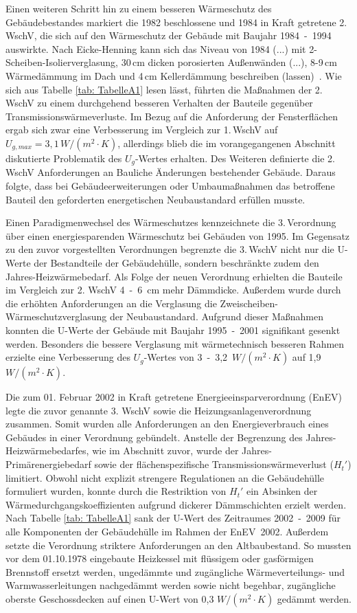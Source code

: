 Einen weiteren Schritt hin zu einem besseren Wärmeschutz des Gebäudebestandes markiert die 1982 beschlossene und 1984 in Kraft getretene 2. WschV, die sich auf den Wärmeschutz der Gebäude mit Baujahr \mbox{1984 - 1994} auswirkte.
Nach Eicke-Henning kann sich \glqq das Niveau von 1984 (...) mit 2-Scheiben-Isolierverglasung, 30\,cm dicken porosierten Außenwänden (...), 8-9\,cm Wärmedämmung im Dach und 4\,cm Kellerdämmung beschreiben (lassen) \grqq\,\cite{EickeHenning.2011}.
Wie sich aus Tabelle \ref{tab: TabelleA1} lesen lässt, führten die Maßnahmen der 2.\,WschV zu einem durchgehend besseren Verhalten der Bauteile gegenüber Transmissionswärmeverluste. 
Im Bezug auf die Anforderung der Fensterflächen ergab sich zwar eine Verbesserung im Vergleich zur 1.\,WschV auf \(U_{g, max} = 3,1\,W/(m^2 \cdot K) \), allerdings blieb die im vorangegangenen Abschnitt diskutierte Problematik des \(U_g\)-Wertes erhalten.
Des Weiteren definierte die 2. WschV Anforderungen an \glqq Bauliche Änderungen bestehender Gebäude\grqq.
Daraus folgte, dass bei Gebäudeerweiterungen oder Umbaumaßnahmen das betroffene Bauteil den geforderten energetischen Neubaustandard erfüllen musste.

Einen Paradigmenwechsel des Wärmeschutzes kennzeichnete die 3.\,Verordnung über einen energiesparenden Wärmeschutz bei Gebäuden von 1995.
Im Gegensatz zu den zuvor vorgestellten Verordnungen begrenzte die 3.\,WschV nicht nur die U-Werte der Bestandteile der Gebäudehülle, sondern beschränkte zudem den Jahres-Heizwärmebedarf.
Als Folge der neuen Verordnung erhielten die Bauteile im Vergleich zur 2. WschV \mbox{4 - 6 cm} mehr Dämmdicke. 
Außerdem wurde durch die erhöhten Anforderungen an die Verglasung die Zweischeiben-Wärmeschutzverglasung der Neubaustandard.
Aufgrund dieser Maßnahmen konnten die U-Werte der Gebäude mit Baujahr \mbox{1995 - 2001} signifikant gesenkt werden.
Besonders die bessere Verglasung mit wärmetechnisch besseren Rahmen erzielte eine Verbesserung des \(U_g\)-Wertes von \mbox{3 - 3,2 \(W/(m^2 \cdot K) \)} auf 1,9\,\(W/(m^2 \cdot K) \).

Die zum 01. Februar 2002 in Kraft getretene Energieeinsparverordnung (EnEV) legte die zuvor genannte 3. WschV sowie die Heizungsanlagenverordnung zusammen. 
Somit wurden alle Anforderungen an den Energieverbrauch eines Gebäudes in einer Verordnung gebündelt.
Anstelle der Begrenzung des Jahres-Heizwärmebedarfes, wie im Abschnitt zuvor, wurde der Jahres-Primärenergiebedarf sowie der flächenspezifische Transmissionswärmeverlust (\(H_t'\)) limitiert.
Obwohl nicht explizit strengere Regulationen an die Gebäudehülle formuliert wurden, konnte durch die Restriktion von \(H_t'\) ein Absinken der Wärmedurchgangskoeffizienten aufgrund dickerer Dämmschichten erzielt werden.
Nach Tabelle \ref{tab: TabelleA1} sank der U-Wert des Zeitraumes \mbox{2002 - 2009} für alle Komponenten der Gebäudehülle im Rahmen der \mbox{EnEV 2002}.
Außerdem setzte die Verordnung striktere Anforderungen an den Altbaubestand. 
So mussten vor dem 01.10.1978 eingebaute Heizkessel mit flüssigem oder gasförmigen Brennstoff ersetzt werden, ungedämmte und zugängliche Wärmeverteilungs- und Warmwasserleitungen nachgedämmt werden sowie nicht begehbar, zugängliche oberste Geschossdecken auf einen U-Wert von 0,3 \(W/(m^2 \cdot K) \) gedämmt werden.

